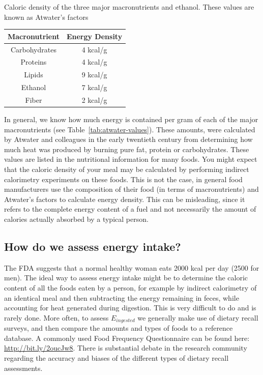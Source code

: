 \documentclass{tufte-handout}
\begin{document}
\begin{margintable}
\centering
\caption{Caloric density of the three major macronutrients and ethanol.  These values are known as Atwater's factors}\label{tab:atwater-values}
\begin{tabular}{cc}
\hline
\textbf{Macronutrient}       & \textbf{Energy Density}                     \\
\hline
Carbohydrates & 4 kcal/g \\
Proteins & 4 kcal/g \\
Lipids & 9 kcal/g \\
Ethanol & 7 kcal/g \\
Fiber & 2 kcal/g \\

\hline
\end{tabular}
\end{margintable}

In general, we know how much energy is contained per gram of each of the major macronutrients (see Table~\ref{tab:atwater-values}).  These amounts, were calculated by Atwater and colleagues in the early twentieth century from determining how much heat was produced by burning pure fat, protein or carbohydrates.  These values are listed in the nutritional information for many foods.  You might expect that the caloric density of your meal may be calculated by performing indirect calorimetry experiments on these foods.  This is not the case, in general food manufacturers use the composition of their food (in terms of macronutrients) and Atwater's factors to calculate energy density.  This can be misleading, since it refers to the complete energy content of a fuel and not necessarily the amount of calories actually absorbed by a typical person.  

\subsection{How do we assess energy intake?}

The FDA suggests that a normal healthy woman eats 2000 kcal per day (2500 for men).  The ideal way to assess energy intake might be to determine the caloric content of all the foods eaten by a person, for example by indirect calorimetry of an identical meal and then subtracting the energy remaining in feces, while accounting for heat generated during digestion.  This is very difficult to do and is rarely done.   More often, to assess $E_{ingested}$ we generally make use of dietary recall surveys, and then compare the amounts and types of foods to a reference database.  A commonly used Food Frequency Questionnaire can be found here: \url{http://bit.ly/2oucJw8}.  There is substantial debate in the research community regarding the accuracy and biases of the different types of dietary recall assessments.
\end{document}
